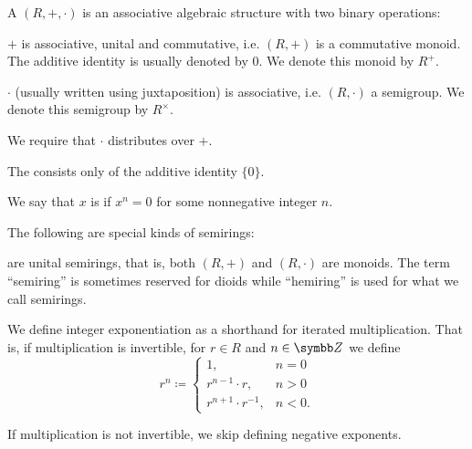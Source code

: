 \begin{definition}\label{def:semiring}
  A  \( (R, +, \cdot) \) is an associative algebraic structure with two binary operations:
  \begin{description}
     \( + \) is associative, unital and commutative, i.e. \( (R, +) \) is a commutative monoid. The additive identity is usually denoted by \( 0 \). We denote this monoid by \( R^+ \).

     \( \cdot \) (usually written using juxtaposition) is associative, i.e. \( (R, \cdot) \) a semigroup. We denote this semigroup by \( R^\times \).
  \end{description}

  We require that \( \cdot \) distributes over \( + \).

  The  consists only of the additive identity \( \{ 0 \} \).

  We say that \( x \) is  if \( x^n = 0 \) for some nonnegative integer \( n \).

  The following are special kinds of semirings:
  \begin{defenum}
      are unital semirings, that is, both \( (R, +) \) and \( (R, \cdot) \) are monoids. The term \enquote{semiring} is sometimes reserved for dioids while \enquote{hemiring} is used for what we call semirings.

    We define integer exponentiation as a shorthand for iterated multiplication. That is, if multiplication is invertible, for \( r \in R \) and \( n \in \BZ \) we define
    \begin{equation*}
      r^n \coloneqq \begin{cases}
        1,    &n = 0 \\
        r^{n - 1} \cdot r, &n > 0 \\
        r^{n + 1} \cdot r^{-1}, &n < 0.
      \end{cases}
    \end{equation*}

    If multiplication is not invertible, we skip defining negative exponents.


\end{defenum}
\end{definition}

